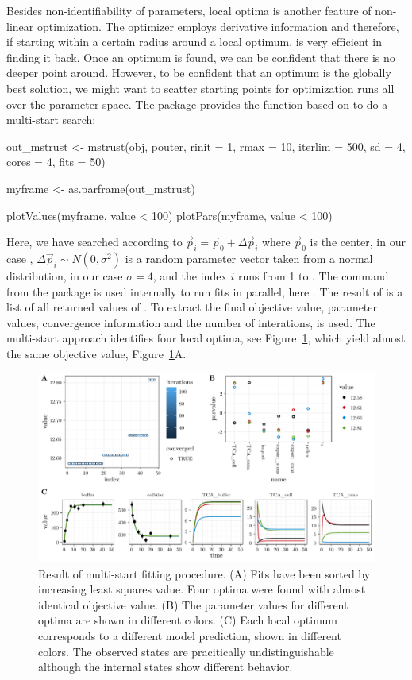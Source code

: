 \documentclass[article]{jss}
\begin{document}
Besides non-identifiability of parameters, local optima is another feature of non-linear optimization. The  optimizer employs derivative information and therefore, if starting within a certain radius around a local optimum, is very efficient in finding it back. Once an optimum is found, we can be confident that there is no deeper point around. However, to be confident that an optimum is the globally best solution, we might want to scatter starting points for optimization runs all over the parameter space. The  package provides the  function based on  to do a multi-start search:
\begin{CodeChunk}
\begin{CodeInput}
out_mstrust <- mstrust(obj, pouter, rinit = 1, rmax = 10, iterlim = 500,
                       sd = 4,
                       cores = 4, fits = 50)

myframe <- as.parframe(out_mstrust)

plotValues(myframe, value < 100)
plotPars(myframe, value < 100)
\end{CodeInput}
\end{CodeChunk}
Here, we have searched according to $\vec p_i = \vec p_0 + \Delta\vec p_i$ where $\vec p_0$ is the center, in our case , $\Delta\vec p_i\sim N(0, \sigma^2)$ is a random parameter vector taken from a normal distribution, in our case $\sigma = 4$, and the index $i$ runs from 1 to . The  command from the  package is used internally to run fits in parallel, here . The result of  is a list of all returned values of . To extract the final objective value, parameter values, convergence information and the number of interations,  is used. The multi-start approach identifies four local optima, see Figure~\ref{fig:mstrust}, which yield almost the same objective value, Figure~\ref{fig:mstrust}A.
\begin{figure}[ht]
	\centering
	\includegraphics[width = \textwidth]{images/figure5}
	\caption{Result of multi-start fitting procedure. (A) Fits have been sorted by increasing least squares value. Four optima were found with almost identical objective value. (B) The parameter values for different optima are shown in different colors. (C) Each local optimum corresponds to a different model prediction, shown in different colors. The observed states are pracitically undistinguishable although the internal states show different behavior.}
	\label{fig:mstrust}
\end{figure}
\end{document}
